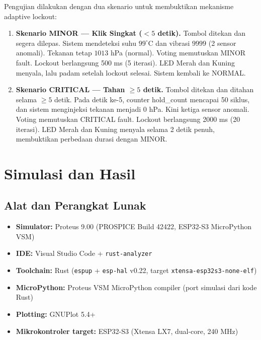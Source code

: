 \documentclass[12pt,a4paper]{article}
\begin{document}
Pengujian dilakukan dengan dua skenario untuk membuktikan mekanisme adaptive lockout:

\begin{enumerate}
  \item \textbf{Skenario MINOR — Klik Singkat ($<5$ detik).} Tombol ditekan dan segera dilepas. Sistem mendeteksi suhu $99^\circ$C dan vibrasi $9999$ (2 sensor anomali). Tekanan tetap $1013$ hPa (normal). Voting memutuskan MINOR fault. Lockout berlangsung 500 ms (5 iterasi). LED Merah dan Kuning menyala, lalu padam setelah lockout selesai. Sistem kembali ke NORMAL.
  \item \textbf{Skenario CRITICAL — Tahan $\geq 5$ detik.} Tombol ditekan dan ditahan selama $\geq 5$ detik. Pada detik ke-5, counter hold\_count mencapai 50 siklus, dan sistem menginjeksi tekanan menjadi $0$ hPa. Kini ketiga sensor anomali. Voting memutuskan CRITICAL fault. Lockout berlangsung 2000 ms (20 iterasi). LED Merah dan Kuning menyala selama 2 detik penuh, membuktikan perbedaan durasi dengan MINOR.
\end{enumerate}

\newpage

\section{Simulasi dan Hasil}


\subsection{Alat dan Perangkat Lunak}

\begin{itemize}
  \item \textbf{Simulator:} Proteus 9.00 (PROSPICE Build 42422, ESP32-S3 MicroPython VSM)
  \item \textbf{IDE:} Visual Studio Code + \texttt{rust-analyzer}
  \item \textbf{Toolchain:} Rust (\texttt{espup} + \texttt{esp-hal} v0.22, target \texttt{xtensa-esp32s3-none-elf})
  \item \textbf{MicroPython:} Proteus VSM MicroPython compiler (port simulasi dari kode Rust)
  \item \textbf{Plotting:} GNUPlot 5.4+
  \item \textbf{Mikrokontroler target:} ESP32-S3 (Xtensa LX7, dual-core, 240 MHz)
\end{itemize}
\end{document}
